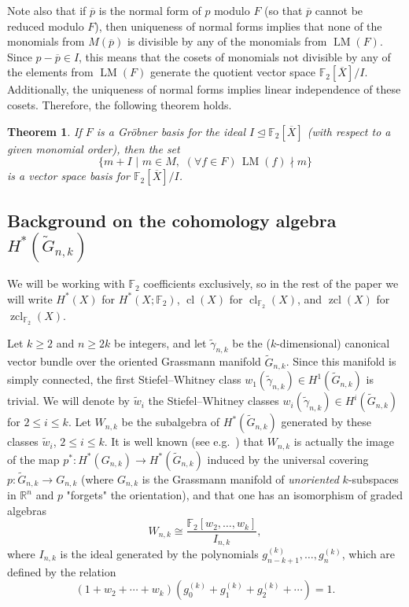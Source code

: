 \documentclass{amsart}
\newtheorem{theorem}{Theorem}[section]
\theoremstyle{definition}
\theoremstyle{remark}
\numberwithin{equation}{section}
\newcommand{\R}{\mathbb R}
\newcommand{\F}{\mathbb F}
\newcommand{\gr}{\widetilde G}
\newcommand{\w}{\widetilde w}
\newcommand{\lm}{\operatorname{LM}}
\newcommand{\cl}{\operatorname{cl}}
\newcommand{\zcl}{\operatorname{zcl}}
\newcommand{\arr}{\rightarrow}
\renewcommand{\le}{\leqslant}
\renewcommand{\ge}{\geqslant}
\begin{document}
Note also that if $\overline p$ is the normal form of $p$ modulo $F$ (so that $\overline p$ cannot be reduced modulo $F$), then uniqueness of normal forms implies that none of the monomials from $M(\overline p)$ is divisible by any of the monomials from $\lm(F)$. Since $p-\overline p\in I$, this means that the cosets of monomials not divisible by any of the elements from $\lm(F)$ generate the quotient vector space $\F_2[\overline X]/I$. Additionally, the uniqueness of normal forms implies linear independence of these cosets. Therefore, the following theorem holds.
\begin{theorem}\label{additive basis}
    If $F$ is a Gr\"obner basis for the ideal $I\trianglelefteq\F_2[\overline X]$ (with respect to a given monomial order), then the set
    \[\Big\{m+I\,\,\Big|\,\, m\in M,\,\, (\forall f\in F)\, \lm(f)\nmid m\Big\}\]
    is a vector space basis for $\F_2[\overline X]/I$.
\end{theorem}




\subsection{Background on the cohomology algebra $H^*(\gr_{n,k})$}

We will be working with $\mathbb F_2$ coefficients exclusively, so in the rest of the paper we will write $H^*(X)$ for $H^*(X;\mathbb F_2)$, $\cl(X)$ for $\cl_{\mathbb F_2}(X)$, and $\zcl(X)$ for $\zcl_{\mathbb F_2}(X)$.




Let $k\ge2$ and $n\ge2k$ be integers, and let $\widetilde{\gamma}_{n,k}$ be the ($k$-dimensional) canonical vector bundle over the oriented Grassmann manifold $\gr_{n,k}$. Since this manifold is simply connected, the first Stiefel--Whitney class $w_1(\widetilde\gamma_{n,k})\in H^1(\gr_{n,k})$ is trivial. We will denote by $\w_i$ the Stiefel--Whitney classes $w_i(\widetilde\gamma_{n,k})\in H^i(\gr_{n,k})$ for $2\le i\le k$. Let $W_{n,k}$ be the subalgebra of $H^*(\gr_{n,k})$ generated by these classes $\w_i$, $2\le i\le k$. It is well known (see e.g.\ \cite[p.\ 197]{CP}) that $W_{n,k}$ is actually the image of the map $p^*: H^*(G_{n,k})\rightarrow H^*(\gr_{n,k})$ induced by the universal covering $p:\gr_{n,k}\arr G_{n,k}$ (where $G_{n,k}$ is the Grassmann manifold of {\it unoriented} $k$-subspaces in $\R^n$ and $p$ "forgets" the orientation), and that one has an isomorphism of graded algebras
\begin{equation}\label{eq:imp*2}
W_{n,k} \cong \frac{\mathbb F_2[w_2,\dots,w_k]}{I_{n,k}},
\end{equation}
where $I_{n,k}$ is the ideal generated by the polynomials $g_{n-k+1}^{(k)},\dots ,g_n^{(k)}$, which are defined by the relation
\begin{equation}\label{power_series}
(1+w_2+\cdots+w_k)(g_0^{(k)}+g_1^{(k)}+g_2^{(k)}+\cdots)=1.
\end{equation}
\end{document}

